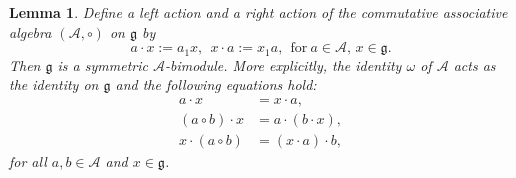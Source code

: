 \documentclass[12pt]{article}
\numberwithin{equation}{section}
\newtheorem{lemma}[theorem]{Lemma}
\theoremstyle{definition}
\theoremstyle{plain}
\newcommand{\fg}{\mathfrak{g}}
\newcommand{\cA}{\ensuremath{\mathcal{A}}}
\begin{document}
\begin{lemma}\label{lem:A-mod.g}
    Define a left action and a right action of the commutative associative algebra $(\cA,\circ)$ on $\fg$ by
    \begin{equation*}
        a\cdot x:=a_1x,\ \ x\cdot a:=x_1a,\ \ \text{for}\ a\in \cA,\, x\in\fg.
    \end{equation*}
    Then $\fg$ is a symmetric $\cA$-bimodule. More explicitly, the identity $\omega$ of $\cA$ acts as the identity on $\fg$ and the following equations hold\textup{:}
    \begin{align}
        a\cdot x &= x\cdot a,\label{a.x.comm}\\
        (a\circ b)\cdot x &= a\cdot (b\cdot x),\label{a.x.asso}\\
        x\cdot (a\circ b) &= (x\cdot a)\cdot b,\label{a.x.asso.r}
    \end{align}
    for all $a,b\in \cA$ and $x\in\fg$.
\end{lemma}
\end{document}
